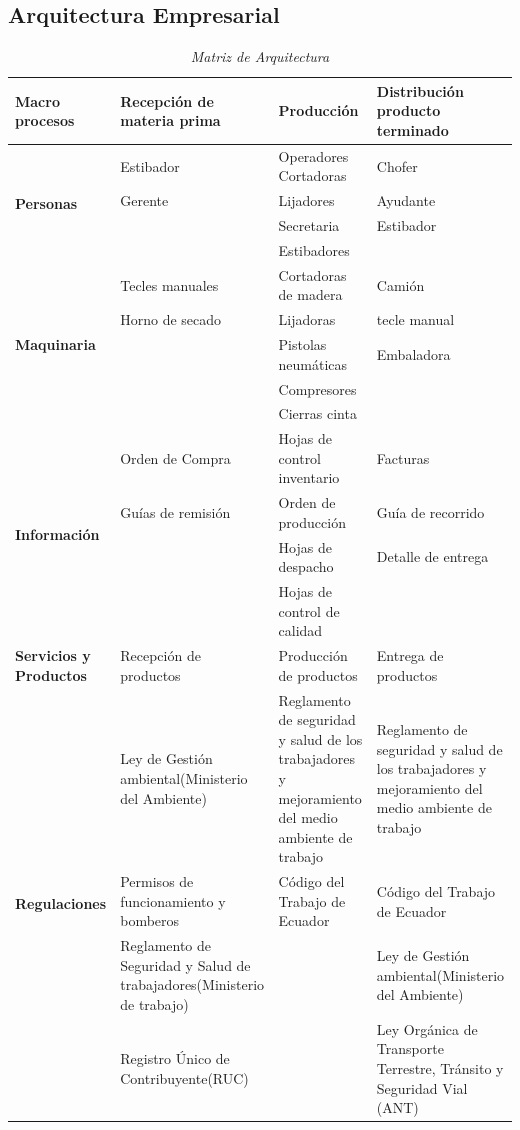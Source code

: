\documentclass[12pt, a4paper]{article}
\begin{document}
\subsection{Arquitectura Empresarial }
\begin{table}[H]
\centering
\caption{\textit{{Matriz de Arquitectura}}}
\label{Matriz:Arquitectura}
\begin{tabular}{|p{2cm}|p{3.5cm}|p{4cm}|p{4cm}|}
\hline
\multicolumn{1}{|p{2.5cm}|}{\textbf{Macro procesos}} & \textbf{Recepción de materia prima} & \textbf{Producción} & \textbf{Distribución producto terminado} \\ \hline
\multirow{4}{2.5cm}{\textbf{Personas}} & Estibador & Operadores Cortadoras & Chofer \\ \cline{2-4} 
 & Gerente & Lijadores & Ayudante \\ \cline{2-4} 
 &  & Secretaria & Estibador \\ \cline{2-4} 
 &  & Estibadores &  \\ \hline
\multirow{5}{2.5cm}{\textbf{Maquinaria}} & Tecles manuales & Cortadoras de madera & Camión \\ \cline{2-4} 
 & Horno de secado & Lijadoras & tecle manual \\ \cline{2-4} 
 &  & Pistolas neumáticas & Embaladora \\ \cline{2-4} 
 &  & Compresores &  \\ \cline{2-4} 
 &  & Cierras cinta &  \\ \hline
\multirow{4}{2.5cm}{\textbf{Información}} & Orden de Compra & Hojas de control inventario & Facturas \\ \cline{2-4} 
 & Guías de remisión & Orden de producción & Guía de recorrido \\ \cline{2-4} 
 &  & Hojas de despacho & Detalle de entrega \\ \cline{2-4} 
 &  & Hojas de control de calidad &  \\ \hline
\multicolumn{1}{|p{2.5cm}|}{\textbf{Servicios y Productos}} & Recepción de productos & Producción de productos & Entrega de productos \\ \hline
\multirow{4}{2cm}{\textbf{Regulaciones}} & Ley de Gestión ambiental(Ministerio del Ambiente) & Reglamento de seguridad y salud de los trabajadores y mejoramiento del medio ambiente de trabajo & Reglamento de seguridad y salud de los trabajadores y mejoramiento del medio ambiente de trabajo \\ \cline{2-4} 
 & Permisos de funcionamiento y bomberos & Código del Trabajo de Ecuador & Código del Trabajo de Ecuador \\ \cline{2-4} 
 & Reglamento de Seguridad y Salud de trabajadores(Ministerio de trabajo) &  & Ley de Gestión ambiental(Ministerio del Ambiente) \\ \cline{2-4} 
 & Registro Único de Contribuyente(RUC) &  & Ley Orgánica de Transporte Terrestre, Tránsito y Seguridad Vial (ANT) \\ \hline
\end{tabular}
\end{table}
\end{document}
